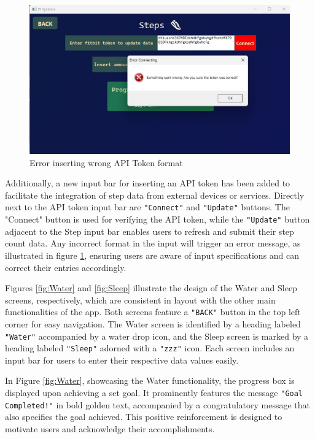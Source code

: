 \documentclass[12pt]{article}
\begin{document}
\begin{figure}[h!]
  \centering
  \includegraphics[width = \linewidth]{Error}
  \caption{Error inserting wrong API Token format}
  \label{fig:Error}
\end{figure}

Additionally, a new input bar for inserting an API token has been added to facilitate the integration of step data from
external devices or services. Directly next to the API token input bar are \texttt{"Connect"} and 
\texttt{"Update"} buttons. The "Connect" button is used for verifying the API token, while the \texttt{"Update"}
button adjacent to the Step input bar enables users to refresh and submit their step count 
data. Any incorrect format in the input will trigger an error message, as illustrated in 
figure \ref{fig:Error}, ensuring users are aware of input specifications and can correct their entries accordingly.\par

Figures \ref{fig:Water} and \ref{fig:Sleep} illustrate the design of the Water and Sleep screens,
respectively, which are consistent in layout with the other main functionalities of the app. 
Both screens feature a \texttt{"BACK"} button in the top left corner for easy navigation. The Water 
screen is identified by a heading labeled \texttt{"Water"} accompanied by a water drop icon, and the
Sleep screen is marked by a heading labeled \texttt{"Sleep"} adorned with a \texttt{"zzz"} icon. Each screen 
includes an input bar for users to enter their respective data values easily.\par

In Figure \ref{fig:Water}, showcasing the Water functionality, the progress box is displayed
upon achieving a set goal. It prominently features the message \texttt{"Goal Completed!"} in bold 
golden text, accompanied by a congratulatory message that also specifies the goal achieved.
This positive reinforcement is designed to motivate users and acknowledge their accomplishments.\par
\end{document}
